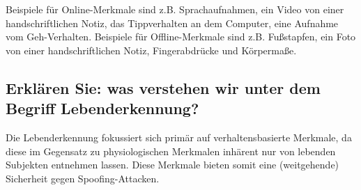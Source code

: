 \documentclass{article}
\begin{document}
Beispiele für Online-Merkmale sind z.B. Sprachaufnahmen, ein Video von einer handschriftlichen Notiz, das 
Tippverhalten an dem Computer, eine Aufnahme vom Geh-Verhalten. Beispiele für Offline-Merkmale sind z.B. 
Fußstapfen, ein Foto von einer handschriftlichen Notiz, Fingerabdrücke und Körpermaße.

\subsection{Erklären Sie: was verstehen wir unter dem Begriff Lebenderkennung?}

Die Lebenderkennung fokussiert sich primär auf verhaltensbasierte Merkmale, da diese im Gegensatz zu
physiologischen Merkmalen inhärent nur von lebenden Subjekten entnehmen lassen. Diese Merkmale bieten 
somit eine (weitgehende) Sicherheit gegen Spoofing-Attacken.
\end{document}
